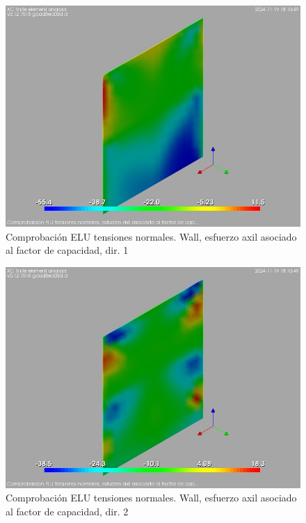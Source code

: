 \begin{figure}[ht]
\begin{center}
\includegraphics[width=\linewidth]{results/graphics/normStrsULS/wallNSect1}
\caption{Comprobación ELU tensiones normales. Wall, esfuerzo axil asociado al factor de capacidad, dir. 1}
\label{ULS_normalStressesResistancewallNSect1}
\end{center}
\end{figure}
\begin{figure}[ht]
\begin{center}
\includegraphics[width=\linewidth]{results/graphics/normStrsULS/wallNSect2}
\caption{Comprobación ELU tensiones normales. Wall, esfuerzo axil asociado al factor de capacidad, dir. 2}
\label{ULS_normalStressesResistancewallNSect2}
\end{center}
\end{figure}
